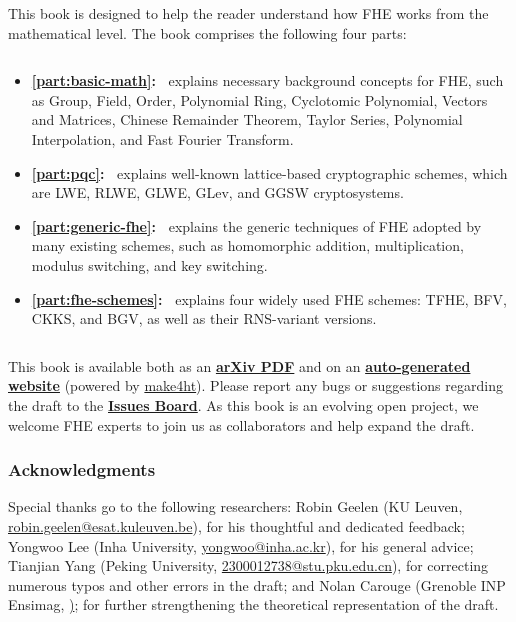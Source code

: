 \documentclass[11pt]{article}
\begin{document}
This book is designed to help the reader understand how FHE works from the mathematical level. The book comprises the following four parts: 

$ $

\begin{itemize}
\item \textbf{\autoref{part:basic-math}:~} explains necessary background concepts for FHE, such as Group, Field, Order, Polynomial Ring, Cyclotomic Polynomial, Vectors and Matrices, Chinese Remainder Theorem, Taylor Series, Polynomial Interpolation, and Fast Fourier Transform.

\item \textbf{\autoref{part:pqc}:~} explains well-known lattice-based cryptographic schemes, which are LWE, RLWE, GLWE, GLev, and GGSW cryptosystems.

\item \textbf{\textbf{\autoref{part:generic-fhe}:~}} explains the generic techniques of FHE adopted by many existing schemes, such as homomorphic addition, multiplication, modulus switching, and key switching. 


\item \textbf{\textbf{\autoref{part:fhe-schemes}:~}} explains four widely used FHE schemes: TFHE, BFV, CKKS, and BGV, as well as their RNS-variant versions.
\end{itemize}

$ $



This book is available both as an \href{https://arxiv.org/abs/2503.05136}{\textbf{arXiv PDF}} and on an \href{https://fhetextbook.github.io} {\textbf{auto-generated website}} (powered by \href{https://www.kodymirus.cz/overleaf-html-sample/main.html}{make4ht}). 
Please report any bugs or suggestions regarding the draft to the \href{https://github.com/fhetextbook/fhe-textbook/issues}{\textbf{Issues Board}}. As this book is an evolving open project, we welcome FHE experts to join us as collaborators and help expand the draft.



\subsubsection*{Acknowledgments}
Special thanks go to the following researchers: Robin Geelen (KU Leuven, \href{mailto:robin.geelen@esat.kuleuven.be}{robin.geelen@esat.kuleuven.be}), for his thoughtful and dedicated feedback; Yongwoo Lee (Inha University, \href{mailto:yongwoo@inha.ac.kr}{yongwoo@inha.ac.kr}), for his general advice; Tianjian Yang (Peking University, \href{mailto:robin.geelen@esat.kuleuven.be}{2300012738@stu.pku.edu.cn}), for correcting numerous typos and other errors in the draft; and Nolan Carouge (Grenoble INP Ensimag, \href{mailto:nolan.carouge.pro@gmail.com}); for further strengthening the theoretical representation of the draft.
\end{document}
